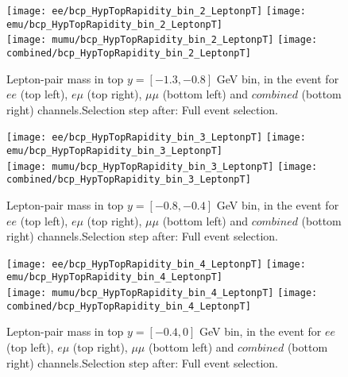 \clearpage
\newpage


\begin{figure}
  \texttt{[image: ee/bcp\_HypTopRapidity\_bin\_2\_LeptonpT]}
  \texttt{[image: emu/bcp\_HypTopRapidity\_bin\_2\_LeptonpT]}\\
  \texttt{[image: mumu/bcp\_HypTopRapidity\_bin\_2\_LeptonpT]}
  \texttt{[image: combined/bcp\_HypTopRapidity\_bin\_2\_LeptonpT]}
\caption{Lepton-pair mass in top $y = [-1.3,-0.8]$ GeV bin, in the event for $ee$ (top left), $e\mu$ (top right), $\mu\mu$ (bottom left) and $combined$ (bottom right) channels.\newline Selection step after: Full event selection.}
\end{figure}

\clearpage
\newpage


\begin{figure}
  \texttt{[image: ee/bcp\_HypTopRapidity\_bin\_3\_LeptonpT]}
  \texttt{[image: emu/bcp\_HypTopRapidity\_bin\_3\_LeptonpT]}\\
  \texttt{[image: mumu/bcp\_HypTopRapidity\_bin\_3\_LeptonpT]}
  \texttt{[image: combined/bcp\_HypTopRapidity\_bin\_3\_LeptonpT]}
\caption{Lepton-pair mass in top $y = [-0.8,-0.4]$ GeV bin, in the event for $ee$ (top left), $e\mu$ (top right), $\mu\mu$ (bottom left) and $combined$ (bottom right) channels.\newline Selection step after: Full event selection.}
\end{figure}

\clearpage
\newpage

\begin{figure}
  \texttt{[image: ee/bcp\_HypTopRapidity\_bin\_4\_LeptonpT]}
  \texttt{[image: emu/bcp\_HypTopRapidity\_bin\_4\_LeptonpT]}\\
  \texttt{[image: mumu/bcp\_HypTopRapidity\_bin\_4\_LeptonpT]}
  \texttt{[image: combined/bcp\_HypTopRapidity\_bin\_4\_LeptonpT]}
\caption{Lepton-pair mass in top $y = [-0.4,0]$ GeV bin, in the event for $ee$ (top left), $e\mu$ (top right), $\mu\mu$ (bottom left) and $combined$ (bottom right) channels.\newline Selection step after: Full event selection.}
\end{figure}

